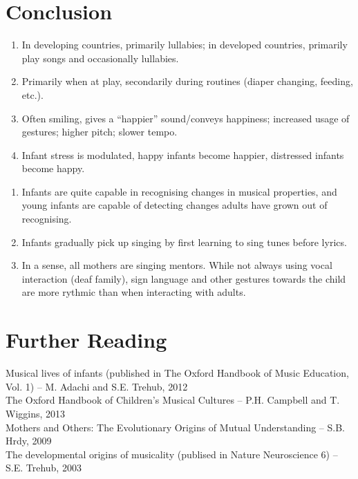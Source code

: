 \documentclass{beamer}
\begin{document}
\section{Conclusion}
\begin{frame}
	\begin{enumerate}
		\item In developing countries, primarily lullabies; in developed countries, primarily play songs and occasionally lullabies.
		\item Primarily when at play, secondarily during routines (diaper changing, feeding, etc.).
		\item Often smiling, gives a ``happier'' sound/conveys happiness; increased usage of gestures; higher pitch; slower tempo.
		\item Infant stress is modulated, happy infants become happier, distressed infants become happy.
	\end{enumerate}
\end{frame}
\begin{frame}
	\begin{enumerate}
		\item Infants are quite capable in recognising changes in musical properties, and young infants are capable of detecting changes adults have grown out of recognising.
		\item Infants gradually pick up singing by first learning to sing tunes before lyrics.
		\item In a sense, all mothers are singing mentors. While not always using vocal interaction (deaf family), sign language and other gestures towards the child are more rythmic than when interacting with adults.
	\end{enumerate}
\end{frame}

\section{Further Reading}
\begin{frame}
	Musical lives of infants (published in The Oxford Handbook of Music Education, Vol. 1) -- M. Adachi and S.E. Trehub, 2012\\
	The Oxford Handbook of Children's Musical Cultures -- P.H. Campbell and T. Wiggins, 2013\\
	Mothers and Others: The Evolutionary Origins of Mutual Understanding -- S.B. Hrdy, 2009\\
	The developmental origins of musicality (publised in Nature Neuroscience 6) -- S.E. Trehub, 2003
\end{frame}
\end{document}
